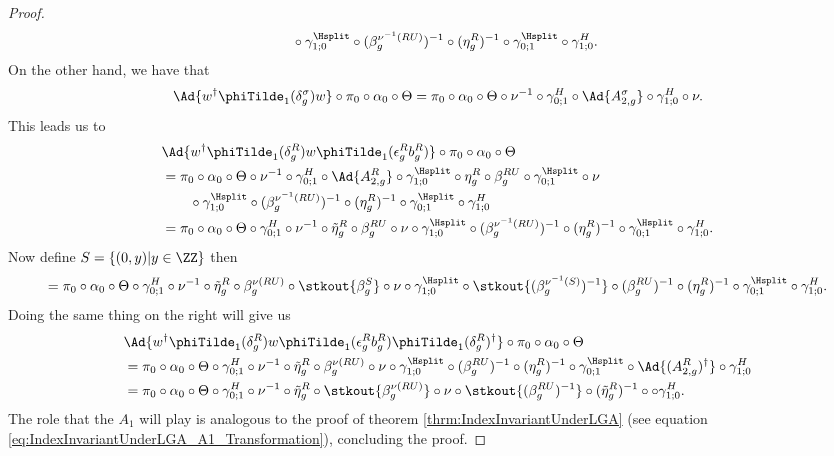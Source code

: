 \begin{proof}
\begin{align}
		\nonumber
		&\qquad \circ\gamma^{\Hsplit}_{1;0}\circ(\beta_g^{\nu^{-1}(RU)})^{-1}\circ(\eta_g^R)^{-1}\circ\gamma^{\Hsplit}_{0;1}\circ\gamma^{H}_{1;0}.
	\end{align}
	On the other hand, we have that
	\begin{equation}
		\Ad{w^\dagger \phiTilde_1(\delta_g^\sigma)w}\circ\pi_0\circ\alpha_0\circ\Theta=\pi_0\circ\alpha_0\circ\Theta\circ\nu^{-1}\circ\gamma^H_{0;1}\circ\Ad{A^\sigma_{2,g}}\circ\gamma^H_{1;0}\circ\nu.
	\end{equation}
	This leads us to
	\begin{align}
		&\Ad{w^\dagger\phiTilde_1(\delta_g^R)w\phiTilde_1(\epsilon_g^R b_g^R)}\circ\pi_0\circ\alpha_0\circ\Theta\\
		&=\pi_0\circ\alpha_0\circ\Theta\circ\nu^{-1}\circ\gamma^H_{0;1}\circ\Ad{A_{2,g}^R}\circ\gamma^{\Hsplit}_{1;0}\circ\eta_g^R\circ\beta_g^{RU}\circ\gamma^{\Hsplit}_{0;1}\circ\nu\\
		\nonumber
		&\qquad \circ\gamma^{\Hsplit}_{1;0}\circ(\beta_g^{\nu^{-1}(RU)})^{-1}\circ(\eta_g^R)^{-1}\circ\gamma^{\Hsplit}_{0;1}\circ\gamma^{H}_{1;0}\\
		&=\pi_0\circ\alpha_0\circ\Theta\circ\gamma^H_{0;1}\circ\nu^{-1}\circ\tilde\eta_g^R\circ\beta_g^{RU}\circ\nu\circ\gamma^{\Hsplit}_{1;0}\circ(\beta_g^{\nu^{-1}(RU)})^{-1}\circ(\eta_g^R)^{-1}\circ\gamma^{\Hsplit}_{0;1}\circ\gamma^{H}_{1;0}.
	\end{align}
	Now define $S=\{(0,y)|y\in\ZZ\}$ then
	\begin{equation}
		=\pi_0\circ\alpha_0\circ\Theta\circ\gamma^H_{0;1}\circ\nu^{-1}\circ\tilde\eta_g^R\circ\beta_g^{\nu(RU)}\circ\stkout{\beta_g^S}\circ\nu\circ\gamma^{\Hsplit}_{1;0}\circ\stkout{(\beta_g^{\nu^{-1}(S)})^{-1}}\circ(\beta_g^{RU})^{-1}\circ(\eta_g^R)^{-1}\circ\gamma^{\Hsplit}_{0;1}\circ\gamma^{H}_{1;0}.
	\end{equation}
	Doing the same thing on the right will give us
	\begin{align}
		&\Ad{w^\dagger\phiTilde_1(\delta_g^R)w\phiTilde_1(\epsilon_g^R b_g^R)\phiTilde_1(\delta_g^R)^\dagger}\circ\pi_0\circ\alpha_0\circ\Theta\\
		&=\pi_0\circ\alpha_0\circ\Theta\circ\gamma^H_{0;1}\circ\nu^{-1}\circ\tilde\eta_g^R\circ\beta_g^{\nu(RU)}\circ\nu\circ\gamma^{\Hsplit}_{1;0}\circ(\beta_g^{RU})^{-1}\circ(\eta_g^R)^{-1}\circ\gamma^{\Hsplit}_{0;1}\circ\Ad{(A_{2,g}^R)^\dagger}\circ\gamma^{H}_{1;0}\\
		&=\pi_0\circ\alpha_0\circ\Theta\circ\gamma^H_{0;1}\circ\nu^{-1}\circ\tilde\eta_g^R\circ\stkout{\beta_g^{\nu(RU)}}\circ\nu\circ\stkout{(\beta_g^{RU})^{-1}}\circ(\tilde\eta_g^R)^{-1}\circ\circ\gamma^{H}_{1;0}.
	\end{align}
	The role that the $A_1$ will play is analogous to the proof of theorem \ref{thrm:IndexInvariantUnderLGA} (see equation \eqref{eq:IndexInvariantUnderLGA_A1_Transformation}), concluding the proof.
\end{proof}
